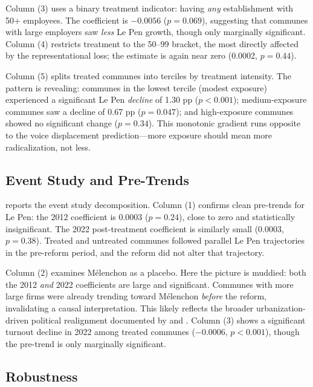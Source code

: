 \documentclass[12pt]{article}
\begin{document}
Column (3) uses a binary treatment indicator: having \textit{any} establishment with 50+ employees. The coefficient is $-0.0056$ ($p = 0.069$), suggesting that communes with large employers saw \textit{less} Le Pen growth, though only marginally significant. Column (4) restricts treatment to the 50--99 bracket, the most directly affected by the representational loss; the estimate is again near zero (0.0002, $p = 0.44$).

Column (5) splits treated communes into terciles by treatment intensity. The pattern is revealing: communes in the lowest tercile (modest exposure) experienced a significant Le Pen \textit{decline} of 1.30 pp ($p < 0.001$); medium-exposure communes saw a decline of 0.67 pp ($p = 0.047$); and high-exposure communes showed no significant change ($p = 0.34$). This monotonic gradient runs opposite to the voice displacement prediction---more exposure should mean more radicalization, not less.

\subsection{Event Study and Pre-Trends}

 reports the event study decomposition. Column (1) confirms clean pre-trends for Le Pen: the 2012 coefficient is 0.0003 ($p = 0.24$), close to zero and statistically insignificant. The 2022 post-treatment coefficient is similarly small (0.0003, $p = 0.38$). Treated and untreated communes followed parallel Le Pen trajectories in the pre-reform period, and the reform did not alter that trajectory.



Column (2) examines M\'elenchon as a placebo. Here the picture is muddied: both the 2012 \textit{and} 2022 coefficients are large and significant. Communes with more large firms were already trending toward M\'elenchon \textit{before} the reform, invalidating a causal interpretation. This likely reflects the broader urbanization-driven political realignment documented by \citet{gethin2022} and \citet{piketty2018}. Column (3) shows a significant turnout decline in 2022 among treated communes ($-0.0006$, $p < 0.001$), though the pre-trend is only marginally significant.

\subsection{Robustness}
\end{document}
